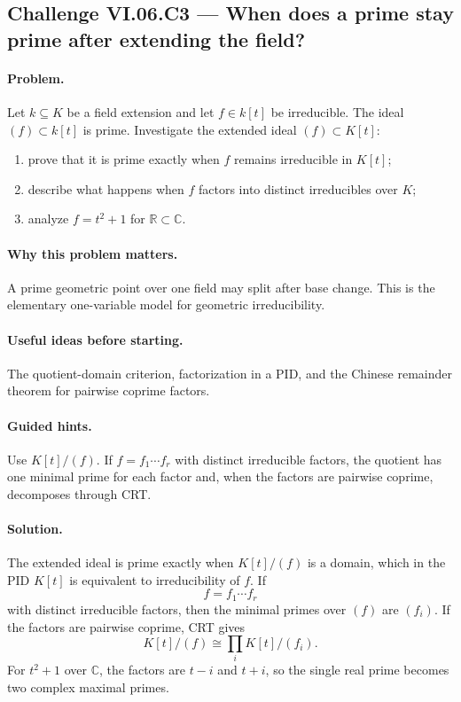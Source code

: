 \subsection*{Challenge VI.06.C3 --- When does a prime stay prime after extending the field?}
\label{chal:vi-06-c3}

\paragraph{Problem.}
Let \(k\subseteq K\) be a field extension and let \(f\in k[t]\) be irreducible.  The ideal
\((f)\subset k[t]\) is prime.  Investigate the extended ideal \((f)\subset K[t]\):
\begin{enumerate}
\item prove that it is prime exactly when \(f\) remains irreducible in \(K[t]\);
\item describe what happens when \(f\) factors into distinct irreducibles over \(K\);
\item analyze \(f=t^2+1\) for \(\mathbb R\subset\mathbb C\).
\end{enumerate}

\ifdefined\FullProblemDossiers
\paragraph{Why this problem matters.}
A prime geometric point over one field may split after base change.  This is the elementary
one-variable model for geometric irreducibility.

\paragraph{Useful ideas before starting.}
The quotient-domain criterion, factorization in a PID, and the Chinese remainder theorem
for pairwise coprime factors.

\paragraph{Guided hints.}
Use \(K[t]/(f)\).  If \(f=f_1\cdots f_r\) with distinct irreducible factors, the quotient
has one minimal prime for each factor and, when the factors are pairwise coprime, decomposes
through CRT.

\paragraph{Solution.}
The extended ideal is prime exactly when \(K[t]/(f)\) is a domain, which in the PID
\(K[t]\) is equivalent to irreducibility of \(f\).  If
\[
f=f_1\cdots f_r
\]
with distinct irreducible factors, then the minimal primes over \((f)\) are \((f_i)\).  If
the factors are pairwise coprime, CRT gives
\[
K[t]/(f)\cong\prod_i K[t]/(f_i).
\]
For \(t^2+1\) over \(\mathbb C\), the factors are \(t-i\) and \(t+i\), so the single real
prime becomes two complex maximal primes.

